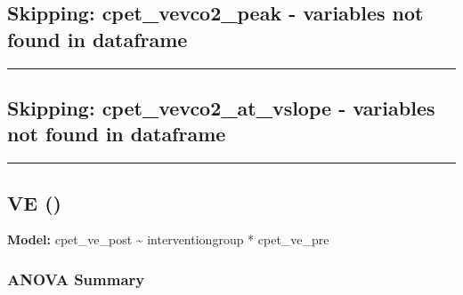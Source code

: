 \documentclass[
]{article}
\begin{document}
\subsection{Skipping: cpet\_vevco2\_peak - variables not found in
dataframe}\label{skipping-cpet_vevco2_peak---variables-not-found-in-dataframe}

\begin{center}\rule{0.5\linewidth}{0.5pt}\end{center}

\subsection{Skipping: cpet\_vevco2\_at\_vslope - variables not found in
dataframe}\label{skipping-cpet_vevco2_at_vslope---variables-not-found-in-dataframe}

\begin{center}\rule{0.5\linewidth}{0.5pt}\end{center}

\subsection{VE ()}\label{ve}

\textbf{Model:} cpet\_ve\_post \textasciitilde{} interventiongroup *
cpet\_ve\_pre

\subsubsection{ANOVA Summary}\label{anova-summary-11}
\end{document}
